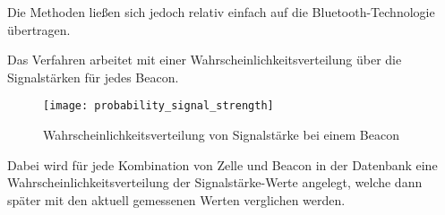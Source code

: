 Die Methoden ließen sich jedoch relativ einfach auf die Bluetooth-Technologie übertragen.

Das Verfahren arbeitet mit einer Wahrscheinlichkeitsverteilung über die Signalstärken für jedes Beacon. 

\begin{figure}[htb!]
		\centering
	\texttt{[image: probability\_signal\_strength]}
	\caption{Wahrscheinlichkeitsverteilung von Signalstärke bei einem Beacon}
	\label{probability-signal-strength-beacon}
\end{figure}


Dabei wird für jede Kombination von Zelle und Beacon in der Datenbank eine Wahrscheinlichkeitsverteilung der Signalstärke-Werte angelegt, welche dann später mit den aktuell gemessenen Werten verglichen werden.






